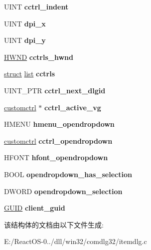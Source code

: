 \begin{DoxyCompactItemize}
U\+I\+NT {\bfseries cctrl\+\_\+indent}
\item 
\mbox{\label{struct_file_dialog_impl_a5ea98a06540fbc0fdc84d1819b3e8deb}} 
U\+I\+NT {\bfseries dpi\+\_\+x}
\item 
\mbox{\label{struct_file_dialog_impl_a03994c8b4c4688f382501a19877903a9}} 
U\+I\+NT {\bfseries dpi\+\_\+y}
\item 
\mbox{\label{struct_file_dialog_impl_a4417ea8c1098f42829087e759b0b7ac6}} 
\hyperlink{interfacevoid}{H\+W\+ND} {\bfseries cctrls\+\_\+hwnd}
\item 
\mbox{\label{struct_file_dialog_impl_a775495fc47626d13c5cafcb93b4a6760}} 
\hyperlink{interfacestruct}{struct} \hyperlink{classlist}{list} {\bfseries cctrls}
\item 
\mbox{\label{struct_file_dialog_impl_ad103ab59ff404fc314e08cbf85cf27fc}} 
U\+I\+N\+T\+\_\+\+P\+TR {\bfseries cctrl\+\_\+next\+\_\+dlgid}
\item 
\mbox{\label{struct_file_dialog_impl_abffaab269f974372e195aec1cd702b7b}} 
\hyperlink{structcustomctrl}{customctrl} $\ast$ {\bfseries cctrl\+\_\+active\+\_\+vg}
\item 
\mbox{\label{struct_file_dialog_impl_a5cf6e951eeda0130171fe9ae6d32c057}} 
H\+M\+E\+NU {\bfseries hmenu\+\_\+opendropdown}
\item 
\mbox{\label{struct_file_dialog_impl_ab4f0a6e31b7381cc8c7f5f5306e59f19}} 
\hyperlink{structcustomctrl}{customctrl} {\bfseries cctrl\+\_\+opendropdown}
\item 
\mbox{\label{struct_file_dialog_impl_a46c2e82622e0157a414475dc5d934784}} 
H\+F\+O\+NT {\bfseries hfont\+\_\+opendropdown}
\item 
\mbox{\label{struct_file_dialog_impl_a18d252aaf84fc9f353bfea48c35f7083}} 
B\+O\+OL {\bfseries opendropdown\+\_\+has\+\_\+selection}
\item 
\mbox{\label{struct_file_dialog_impl_a3f94a987213afe70b0e195af084bf303}} 
D\+W\+O\+RD {\bfseries opendropdown\+\_\+selection}
\item 
\mbox{\label{struct_file_dialog_impl_a97bb226bae7f19c9da93d5e6589e1561}} 
\hyperlink{interface_g_u_i_d}{G\+U\+ID} {\bfseries client\+\_\+guid}
\end{DoxyCompactItemize}


该结构体的文档由以下文件生成\+:\begin{DoxyCompactItemize}
\item 
E\+:/\+React\+O\+S-\/0../dll/win32/comdlg32/itemdlg.\+c\end{DoxyCompactItemize}
